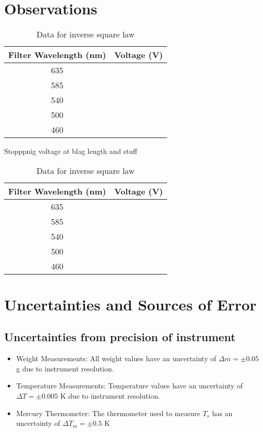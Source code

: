 \documentclass[%
 sor,
 jor,
 amsmath,amssymb,
 reprint,%
]{revtex4-2}
\begin{document}
\section{Observations}


\begin{table}[ht]
\centering
    \begin{minipage}[b]{0.48\hsize}\centering
\begin{tabular}{|c|c|}
\hline
\textbf{Filter Wavelength (nm)} & \textbf{Voltage (V)} \\
\hline
635 & 		\\
585 &          \\  
540 &          \\
500 &          \\
460 &          \\

\hline
\end{tabular}
\caption{Stopppnig voltage at blag length and stuff}
\label{tab:table1}
    \end{minipage}
\hfill\vline\hfill
    \begin{minipage}[b]{0.48\hsize}\centering
\begin{tabular}{|c|c|}
\hline
\textbf{Filter Wavelength (nm)} & \textbf{Voltage (V)} \\
\hline
635 & 		\\
585 &          \\  
540 &          \\
500 &          \\
460 &          \\

\hline
\end{tabular}
\caption{Data for inverse square law}
\label{tab:table2}
   \end{minipage}
\end{table}





\section{Uncertainties and Sources of Error}
\subsection{Uncertainties from precision of instrument}
\begin{itemize}
    \item Weight Measurements:
    All weight values have an uncertainty of $\Delta m = \pm 0.05$ \si{\gram} due to instrument resolution.    
    \item Temperature Measurements: Temperature values have an uncertainty of $\Delta T = \pm 0.005$ \si{\kelvin} due to instrument resolution. 
\item Mercury Thermometer: The thermometer used to measure $T_s$ has an uncertainty of $\Delta T_m = \pm 0.5$ \si{\kelvin}
\end{itemize}
\end{document}
